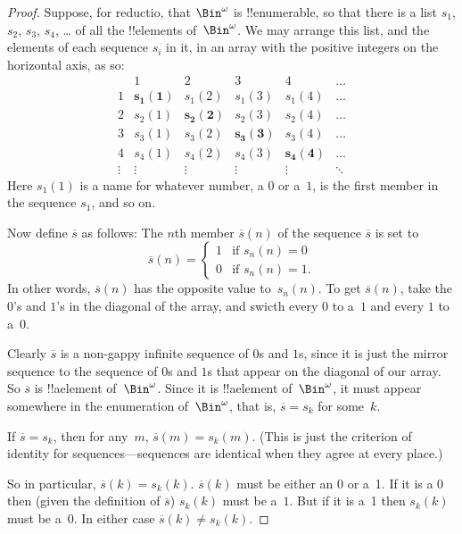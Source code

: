\documentclass[../../../include/open-logic-section]{subfiles}
\begin{document}
\begin{proof}
Suppose, for reductio, that $\Bin^\omega$ is !!{enumerable}, so that
there is a list $s_{1}$, $s_{2}$, $s_{3}$, $s_{4}$, \dots{} of all the
!!{element}s of~$\Bin^\omega$. We may arrange this list, and the
elements of each sequence $s_i$ in it, in an array with the
positive integers on the horizontal axis, as so:
\[
\begin{array}{c|c|c|c|c|c}
& 1 & 2 & 3 & 4 & \dots \\\hline
1 & \mathbf{s_{1}(1)} & s_{1}(2) & s_{1}(3) & s_1(4) & \dots \\\hline
2 & s_{2}(1)& \mathbf{s_{2}(2)} & s_2(3) & s_2(4) & \dots \\\hline
3 & s_{3}(1)& s_{3}(2) & \mathbf{s_3(3)} & s_3(4) & \dots \\\hline
4 & s_{4}(1)& s_{4}(2) & s_4(3) & \mathbf{s_4(4)} & \dots \\\hline
\vdots & \vdots & \vdots & \vdots & \vdots & \mathbf{\ddots}
\end{array}
\]
Here $s_{1}(1)$ is a name for whatever number, a $0$ or a~$1$, is the
first member in the sequence $s_{1}$, and so on.

Now define $\overline{s}$ as follows: The $n$th member
$\overline{s}(n)$ of the sequence
$\overline{s}$ is set to
\[
\overline{s}(n) =
\begin{cases}
1 & \text{if $s_{n}(n) = 0$}\\
0 & \text{if $s_{n}(n) = 1$}.
\end{cases}
\]
In other words, $\overline{s}(n)$ has the opposite value
to~$s_{n}(n)$. To get $\overline{s}(n)$, take the $0$'s and $1$'s in
the diagonal of the array, and swicth every $0$ to a~$1$ and every $1$
to a~$0$.

Clearly $\overline{s}$ is a non-gappy infinite sequence of $0$s and
$1$s, since it is just the mirror sequence to the sequence of $0$s and
$1$s that appear on the diagonal of our array. So $\overline{s}$ is
!!a{element} of~$\Bin^\omega$. Since it is !!a{element}
of~$\Bin^\omega$, it must appear somewhere in the enumeration
of~$\Bin^\omega$, that is, $\overline{s} = s_{k}$ for some~$k$.

If $\overline{s} = s_{k}$, then for any~$m$, $\overline{s}(m) =
s_{k}(m)$. (This is just the criterion of identity for
sequences---sequences are identical when they agree at every place.)

So in particular, $\overline{s}(k) = s_{k}(k)$. $\overline{s}(k)$ must
be either an 0 or a~1. If it is a 0 then (given the definition of
$\overline{s}$) $s_{k}(k)$ must be a~$1$. But if it is a~1 then
$s_{k}(k)$ must be a~0. In either case $\overline{s}(k) \neq
s_{k}(k)$.
\end{proof}
\end{document}
